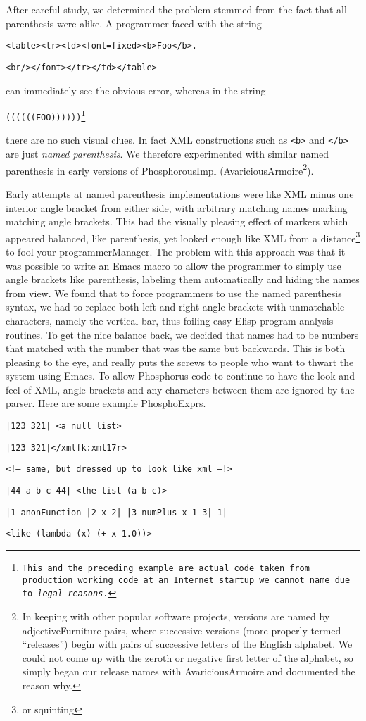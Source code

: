 After careful study, we determined the problem stemmed from the fact
that all parenthesis were alike.  A programmer faced with the string
\smallskip
\centerline{\tt <table><tr><td><font=fixed><b>Foo</b>.}
\centerline{\tt <br/></font></tr></td></table>}
\smallskip
\noindent can immediately see the obvious error, whereas in the string
\smallskip
\centerline{\tt ((((((FOO))))))\footnote{\rm This and the preceding
example are actual code taken from production working code at an
Internet startup we cannot name due to {\it legal reasons}.}}
\smallskip
\noindent there are no such visual clues.  In fact XML constructions
such as {\tt <b>} and {\tt </b>} are just {\it named parenthesis}.  We
therefore experimented with similar named parenthesis in early
versions of PhosphorousImpl (AvariciousArmoire\footnote{In keeping
with other popular software projects, versions are named by
adjectiveFurniture pairs, where successive versions (more properly
termed ``releases'') begin with pairs of successive letters of the
English alphabet. We could not come up with the zeroth or negative
first letter of the alphabet, so simply began our release names with
AvariciousArmoire and documented the reason why.}).

Early attempts at named parenthesis implementations were like XML
minus one interior angle bracket from either side, with arbitrary
matching names marking matching angle brackets.  This had the visually
pleasing effect of markers which appeared balanced, like parenthesis,
yet looked enough like XML from a distance\footnote{or squinting} to
fool your programmerManager.  The problem with this approach was that
it was possible to write an Emacs macro to allow the programmer to
simply use angle brackets like parenthesis, labeling them
automatically and hiding the names from view.  We found that to force
programmers to use the named parenthesis syntax, we had to replace
both left and right angle brackets with unmatchable characters, namely
the vertical bar, thus foiling easy Elisp program analysis routines.
To get the nice balance back, we decided that names had to be numbers
that matched with the number that was the same but backwards.  This is
both pleasing to the eye, and really puts the screws to people who
want to thwart the system using Emacs.  To allow Phosphorus code to
continue to have the look and feel of XML, angle brackets and any
characters between them are ignored by the parser.  Here are some
example PhosphoExprs.
\medskip
\centerline{\tt |123 321| <a null list>}
\medskip\nobreak
\centerline{\tt <xmlfk:xm17r>|123 321|</xmlfk:xml17r>}
\centerline{\tt <!-- same, but dressed up to look like xml --!>}
\medskip\nobreak
\centerline{\tt |44 a b c 44| <the list (a b c)>}
\medskip\nobreak
\centerline{\tt |1 anonFunction |2 x 2| |3 numPlus x 1 3| 1|}
\centerline{\tt <like (lambda (x) (+ x 1.0))>}

